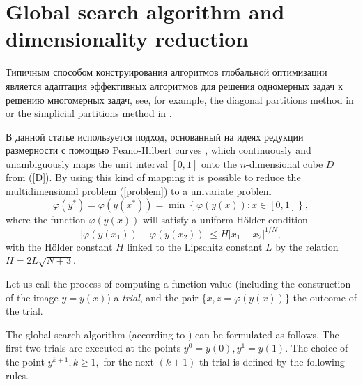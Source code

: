 \documentclass[runningheads]{llncs}
\begin{document}
\section{Global search algorithm and dimensionality reduction}
Типичным способом конструирования алгоритмов глобальной оптимизации является адаптация эффективных алгоритмов для решения одномерных задач к решению многомерных задач, see, for example, the diagonal partitions method in \cite{Sergeyev2006} or the simplicial partitions method in \cite{Zilinskas2008}.

В данной статье используется подход, основанный на идеях редукции размерности с помощью Peano-Hilbert curves \cite{Sergeyev2013,Strongin2000}, which continuously and unambiguously maps the unit interval $[0,1]$ onto the $n$-dimensional cube $D$ from (\ref{D}). By using this kind of mapping it is possible to reduce the multidimensional problem (\ref{problem}) to a univariate problem
\[
\varphi(y^\ast)=\varphi(y(x^\ast))=\min{\left\{\varphi(y(x)): x\in[0,1]\right\}},
\]
where the function $\varphi(y(x))$ will satisfy a uniform H{\"o}lder condition
\[
\left|\varphi(y(x_1))-\varphi(y(x_2))\right|\leq H\left|x_1-x_2\right|^{1/N},
\]
with the H{\"o}lder constant $H$ linked to the Lipschitz constant $L$ by the relation
$ H=2 L \sqrt{N+3}$.

Let us call the process of computing a function value (including the construction of the image $y=y(x)$) a \textit{trial}, and the pair $\{x, z = \varphi(y(x))\}$ the outcome of the trial.

The global search algorithm (according to \cite{Strongin2000}) can be formulated as follows.
The first two trials are executed at 
the points $y^0=y(0), y^1=y(1)$. The choice of the point $y^{k+1},k\geq 1,$  
for the next $(k+1)$-th trial is defined by the following rules.
\end{document}
